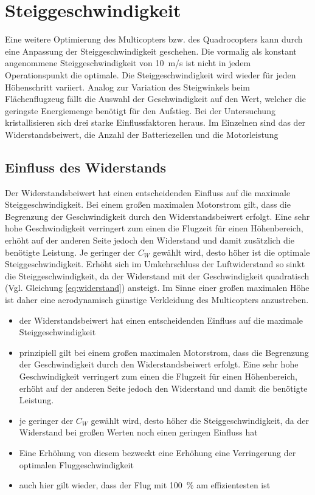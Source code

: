 \section{Steiggeschwindigkeit}
\label{sec:steiggeschwindigkeit}
Eine weitere Optimierung des Multicopters bzw. des Quadrocopters kann durch eine Anpassung der Steiggeschwindigkeit geschehen. Die vormalig als konstant angenommene Steiggeschwindigkeit von \SI{10}{m/s} ist nicht in jedem Operationspunkt die optimale. Die Steiggeschwindigkeit wird wieder für jeden Höhenschritt variiert. Analog zur Variation des Steigwinkels beim Flächenflugzeug fällt die Auswahl der Geschwindigkeit auf den Wert, welcher die geringste Energiemenge benötigt für den Aufstieg. Bei der Untersuchung kristallisieren sich drei starke Einflussfaktoren heraus. Im Einzelnen sind das der Widerstandsbeiwert, die Anzahl der Batteriezellen und die Motorleistung

\subsection{Einfluss des Widerstands}
Der Widerstandsbeiwert hat einen entscheidenden Einfluss auf die maximale Steiggeschwindigkeit. Bei einem großen maximalen Motorstrom gilt, dass die Begrenzung der Geschwindigkeit durch den Widerstandsbeiwert erfolgt. Eine sehr hohe Geschwindigkeit verringert zum einen die Flugzeit für einen Höhenbereich, erhöht auf der anderen Seite jedoch den Widerstand und damit zusätzlich die benötigte Leistung. Je geringer der \ensuremath{C_W} gewählt wird, desto höher ist die optimale Steiggeschwindigkeit. Erhöht sich im Umkehrschluss der Luftwiderstand so sinkt die Steiggeschwindigkeit, da der Widerstand mit der Geschwindigkeit quadratisch (Vgl. Gleichung \ref{eq:widerstand}) ansteigt. Im Sinne einer großen maximalen Höhe ist daher eine aerodynamisch günstige Verkleidung des Multicopters anzustreben.  


\begin{itemize}
	\item der Widerstandsbeiwert hat einen entscheidenden Einfluss auf die maximale Steiggeschwindigkeit
	\item prinzipiell gilt bei einem großen maximalen Motorstrom, dass die Begrenzung der Geschwindigkeit durch den Widerstandsbeiwert erfolgt. Eine sehr hohe Geschwindigkeit verringert zum einen die Flugzeit für einen Höhenbereich, erhöht auf der anderen Seite jedoch den Widerstand und damit die benötigte Leistung. 
	\item je geringer der \ensuremath{C_W} gewählt wird, desto höher die Steiggeschwindigkeit, da der Widerstand bei großen Werten noch einen geringen Einfluss hat
	\item Eine Erhöhung von diesem bezweckt eine Erhöhung eine Verringerung der optimalen Fluggeschwindigkeit
	\item auch hier gilt wieder, dass der Flug mit \SI{100}{\%} am effizientesten ist
\end{itemize}

